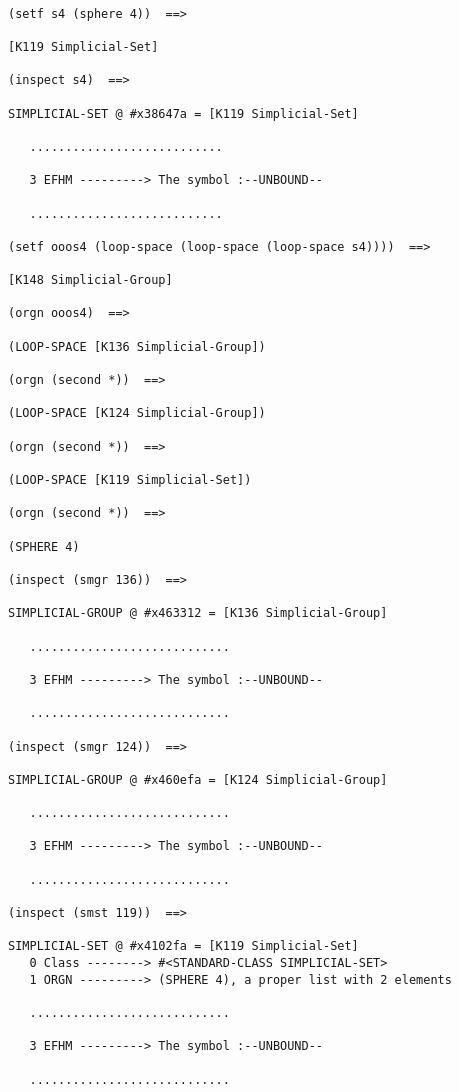 {\footnotesize\begin{verbatim}

(setf s4 (sphere 4))  ==>

[K119 Simplicial-Set]

(inspect s4)  ==>

SIMPLICIAL-SET @ #x38647a = [K119 Simplicial-Set]

   ...........................

   3 EFHM ---------> The symbol :--UNBOUND--

   ...........................

(setf ooos4 (loop-space (loop-space (loop-space s4))))  ==> 

[K148 Simplicial-Group]

(orgn ooos4)  ==>

(LOOP-SPACE [K136 Simplicial-Group])

(orgn (second *))  ==>

(LOOP-SPACE [K124 Simplicial-Group])

(orgn (second *))  ==>

(LOOP-SPACE [K119 Simplicial-Set])

(orgn (second *))  ==>

(SPHERE 4)

(inspect (smgr 136))  ==>

SIMPLICIAL-GROUP @ #x463312 = [K136 Simplicial-Group]

   ............................

   3 EFHM ---------> The symbol :--UNBOUND--

   ............................

(inspect (smgr 124))  ==>

SIMPLICIAL-GROUP @ #x460efa = [K124 Simplicial-Group]

   ............................

   3 EFHM ---------> The symbol :--UNBOUND--

   ............................

(inspect (smst 119))  ==>

SIMPLICIAL-SET @ #x4102fa = [K119 Simplicial-Set]
   0 Class --------> #<STANDARD-CLASS SIMPLICIAL-SET>
   1 ORGN ---------> (SPHERE 4), a proper list with 2 elements

   ............................

   3 EFHM ---------> The symbol :--UNBOUND--

   ............................


\end{verbatim}}
